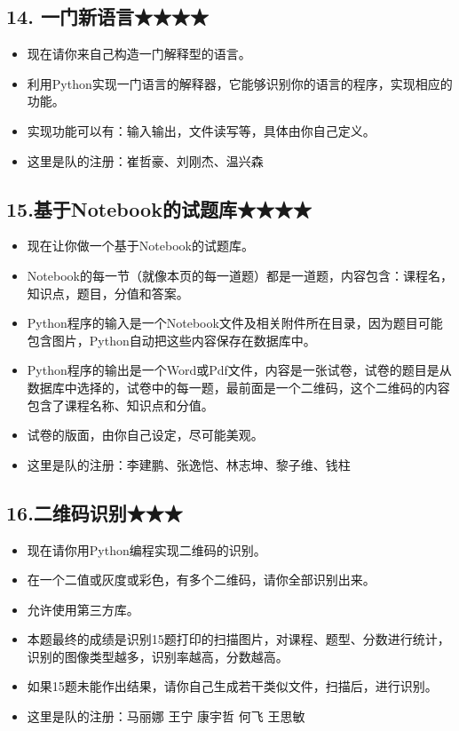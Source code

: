 \documentclass[11pt]{article}
\providecommand{\tightlist}{%
      \setlength{\itemsep}{0pt}\setlength{\parskip}{0pt}}
\begin{document}
    \subsection{14. 一门新语言★★★★}\label{ux4e00ux95e8ux65b0ux8bedux8a00}

\begin{itemize}
\tightlist
\item
  现在请你来自己构造一门解释型的语言。
\item
  利用Python实现一门语言的解释器，它能够识别你的语言的程序，实现相应的功能。
\item
  实现功能可以有：输入输出，文件读写等，具体由你自己定义。
\item
  这里是队的注册：崔哲豪、刘刚杰、温兴森
\end{itemize}

    \subsection{15.基于Notebook的试题库★★★★}\label{ux57faux4e8enotebookux7684ux8bd5ux9898ux5e93}

\begin{itemize}
\tightlist
\item
  现在让你做一个基于Notebook的试题库。
\item
  Notebook的每一节（就像本页的每一道题）都是一道题，内容包含：课程名，知识点，题目，分值和答案。
\item
  Python程序的输入是一个Notebook文件及相关附件所在目录，因为题目可能包含图片，Python自动把这些内容保存在数据库中。
\item
  Python程序的输出是一个Word或Pdf文件，内容是一张试卷，试卷的题目是从数据库中选择的，试卷中的每一题，最前面是一个二维码，这个二维码的内容包含了课程名称、知识点和分值。
\item
  试卷的版面，由你自己设定，尽可能美观。
\item
  这里是队的注册：李建鹏、张逸恺、林志坤、黎子维、钱柱
\end{itemize}

    \subsection{16.二维码识别★★★}\label{ux4e8cux7ef4ux7801ux8bc6ux522b}

\begin{itemize}
\tightlist
\item
  现在请你用Python编程实现二维码的识别。
\item
  在一个二值或灰度或彩色，有多个二维码，请你全部识别出来。
\item
  允许使用第三方库。
\item
  本题最终的成绩是识别15题打印的扫描图片，对课程、题型、分数进行统计，识别的图像类型越多，识别率越高，分数越高。
\item
  如果15题未能作出结果，请你自己生成若干类似文件，扫描后，进行识别。
\item
  这里是队的注册：马丽娜 王宁 康宇哲 何飞 王思敏
\end{itemize}
\end{document}
